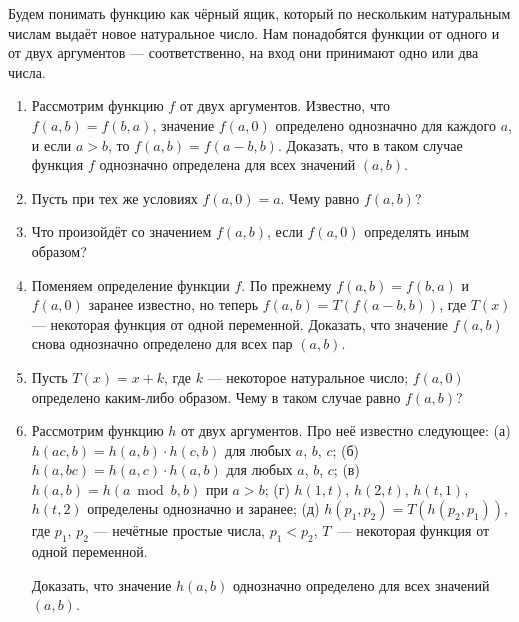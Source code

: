 \vspace{-0.35cm} 

\ms Будем понимать функцию как чёрный ящик, который по нескольким натуральным числам выдаёт новое натуральное число. Нам понадобятся функции от одного и от двух аргументов --- соответственно, на вход они принимают одно или два числа.

\begin{enumerate}

\item Рассмотрим функцию $f$ от двух аргументов. Известно, что $f(a,b) = f(b,a)$, значение $f(a,0)$ определено однозначно для каждого $a$, и если $a>b$, то $f(a,b) = f(a-b,b)$. Доказать, что в таком случае функция $f$ однозначно определена для всех значений $(a,b)$.

\item Пусть при тех же условиях $f(a,0)=a$. Чему равно $f(a,b)$?

\item Что произойдёт со значением $f(a,b)$, если $f(a,0)$ определять иным образом?

\item Поменяем определение функции $f$. По прежнему $f(a,b) = f(b,a)$ и $f(a,0)$ заранее известно, но теперь $f(a,b) = T(f(a-b,b))$, где $T(x)$ --- некоторая функция от одной переменной. Доказать, что значение $f(a,b)$ снова однозначно определено для всех пар $(a,b)$.

\item Пусть $T(x) = x+k$, где $k$ --- некоторое натуральное число; $f(a,0)$ определено каким-либо образом. Чему в таком случае равно $f(a,b)$?

\item Рассмотрим функцию $h$ от двух аргументов. Про неё известно следующее:
  \subitem (а) $h(ac,b) = h(a,b) \cdot h(c,b)$ для любых $a$, $b$, $c$;
  \subitem (б) $h(a,bc) = h(a,c) \cdot h(a,b)$ для любых $a$, $b$, $c$;
  \subitem (в) $h(a,b) = h(a \bmod b, b)$ при $a>b$;
  \subitem (г) $h(1,t)$, $h(2,t)$, $h(t,1)$, $h(t,2)$ определены однозначно и заранее;
  \subitem (д) $h(p_1,p_2) = T(h(p_2,p_1))$, где $p_1$, $p_2$ --- нечётные простые числа, $p_1<p_2$, $T$~--- некоторая функция от одной переменной.

\ms Доказать, что значение $h(a,b)$ однозначно определено для всех значений $(a,b)$.

\end{enumerate}